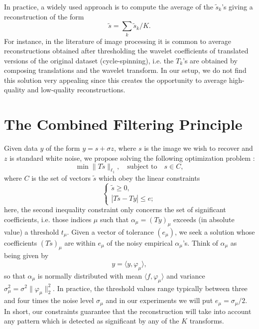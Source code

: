 In practice, a widely used approach is to compute the average of the
$\tilde{s}_k$'s giving a reconstruction of the form
 \begin{equation}
\tilde{s} = \sum_k \tilde{s}_k/K. 
\end{equation}
For instance, in the literature of image processing it is common to
average reconstructions obtained after thresholding the wavelet
coefficients of translated versions of the original dataset
(cycle-spinning), i.e. the $T_k$'s are obtained by composing
translations and the wavelet transform.  In our setup, we do not find
this solution very appealing since this creates the opportunity to
average high-quality and low-quality reconstructions.

\section{The Combined Filtering Principle}

Given data $y$ of the form $y = s + \sigma z$, where $s$ is the image
we wish to recover and $z$ is standard white noise, we propose solving
the following optimization problem \cite{starck:spie01a}:
\begin{equation}
  \label{eq:l1-min}
  \min \|T\tilde{s}\|_{\ell_1}, \quad \mbox{subject to} \quad s \in C,  
\end{equation}
where $C$ is the set of vectors $\tilde{s}$ 
which obey the linear constraints
\begin{equation}
\label{eq:constraints}
\left\{  \begin{array}{ll}
  \tilde{s} \ge 0, \\
  |T\tilde{s} - Ty| \le e; 
  \end{array}
  \right. 
\end{equation}
here, the second inequality constraint 
only concerns the set of significant coefficients, 
i.e. those indices $\mu$ such that $\alpha_\mu =
(Ty)_\mu$ exceeds (in absolute value) a threshold $t_\mu$. Given a
vector of tolerance $(e_\mu)$, we seek a solution whose coefficients
  $(T\tilde{s})_\mu$ are within $e_\mu$ of the noisy
empirical $\alpha_\mu$'s.  Think of $\alpha_\mu$ as being given by
\[
y = \langle y, \varphi_\mu \rangle, 
\]
so that $\alpha_\mu$ is normally distributed with mean $\langle f,
\varphi_\mu \rangle$ and variance $\sigma^2_\mu = \sigma^2
\|\varphi_\mu\|^2_2$. In practice, the threshold values range
typically between three and four times the noise level $\sigma_\mu$
and in our experiments we will put $e_\mu = \sigma_\mu/2$. In short,
our constraints guarantee that the reconstruction will take into
account any pattern which is detected as significant by  any of the
$K$ transforms.
   
